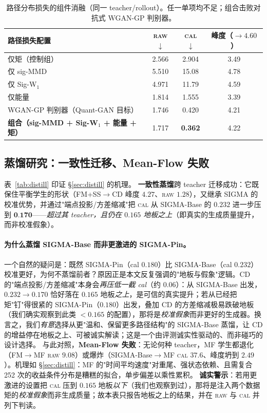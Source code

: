 \documentclass[11pt]{ctexart}
\newcommand{\raw}{\textsc{raw}}
\renewcommand{\cal}{\textsc{cal}}
\newcommand{\best}[1]{\textbf{#1}}
\begin{document}
\begin{table}[t]
\centering
\caption{路径分布损失的组件消融（同一 teacher/rollout）。任一单项均不足；组合击败对抗式 WGAN-GP 判别器。}
\label{tab:ablation}
\small
\begin{tabular}{l c c c}
\toprule
路径损失配置 & \raw{} $\downarrow$ & \cal{} $\downarrow$ & 峰度（$\to 4.60$） \\
\midrule
仅矩（控制组）                       & 2.566 & 2.904 & 3.49 \\
仅 sig-MMD                                & 5.510 & 15.08 & 4.78 \\
仅 Sig-W$_1$                              & 4.971 & 11.79 & 4.59 \\
仅能量                                 & 1.814 & 1.555 & 3.39 \\
WGAN-GP 判别器（Quant-GAN 目标）        & 1.746 & 0.420 & 4.21 \\
\textbf{组合（sig-MMD + Sig-W$_1$ + 能量 + 矩）} & 1.717 & \best{0.362} & 4.22 \\
\bottomrule
\end{tabular}
\end{table}

\subsection{蒸馏研究：一致性迁移、Mean-Flow 失败}
\label{sec:results-distill}
表~\ref{tab:distill} 印证 \S\ref{sec:distill} 的机理。
\textbf{一致性蒸馏}跨 teacher 迁移成功：它既保住平衡学生的形状（FM+SS$\to$CD 峰度 $4.27$、\raw{} $1.28$），又继承 SIGMA 的校准优势，并通过"端点投影/方差缩减"把 \cal{} 从 SIGMA-Base 的 $0.232$ 进一步压到 $\best{0.170}$——\emph{超过其 teacher，且仍在 $0.165$ 地板之上}（即真实的生成质量提升，而非校准假象）。

\paragraph{为什么蒸馏 SIGMA-Base 而非更激进的 SIGMA-Pin。}
一个自然的疑问是：既然 SIGMA-Pin（cal $0.180$）比 SIGMA-Base（cal $0.232$）校准更好，为何不蒸馏前者？原因正是本文反复强调的"地板与假象"逻辑。CD 的"端点投影/方差缩减"本身会\emph{再压低一截 cal}（约 $0.06$）：从 SIGMA-Base 出发，$0.232\!\to\!0.170$ 恰好落在 $0.165$ 地板\emph{之上}，是可信的真实提升；若从已经把矩"钉"得很紧的 SIGMA-Pin（$0.180$）出发，叠加 CD 的方差缩减极易跌破地板（我们确实观察到此类 $<0.165$ 的配置），那将是\emph{校准假象}而非更好的生成器。换言之，我们\emph{有意}选择从更"温和、保留更多路径结构"的 SIGMA-Base 蒸馏，让 CD 的增益停在地板之上、可被诚实解读；这是一个由评测诚实性驱动的、而非碰巧的设计选择。
与此对照，\textbf{Mean-Flow 失败}：无论何种 teacher，MF 学生都退化（FM$\to$MF \raw{} $9.08$）或爆炸（SIGMA-Base$\to$MF \cal{} $37.6$、峰度坍到 $2.49$）。机理如 \S\ref{sec:distill}：MF 的"时间平均速度"对重尾、强状态依赖、且需复合 252 次的收益条件分布是糟糕的拟合，单步偏差以乘性累积。
\textbf{诚实警示}：若用更激进的设置把 \cal{} 压到 $0.165$ 地板\emph{以下}（我们也观察到过），那将是注入两个数据矩的\emph{校准假象}而非生成质量；故本表只报告地板之上的结果，并在 \raw{} 与 \cal{} 并列下判读。
\end{document}
